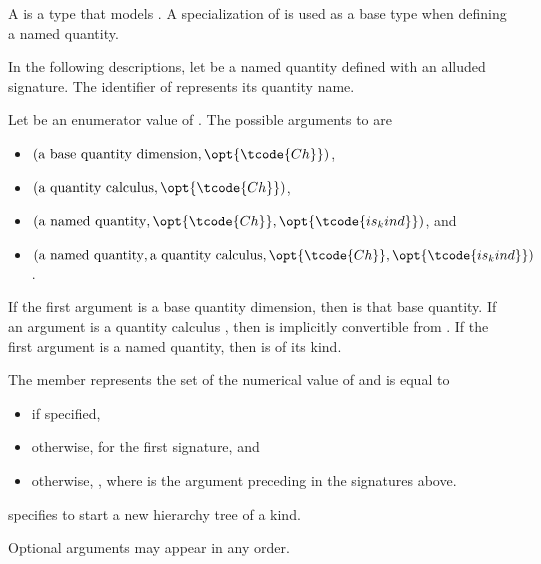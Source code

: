 \pnum
A  is a type that models .
A specialization of  is used as a base type when defining a named quantity.

\pnum
In the following descriptions, let  be a named quantity defined with an alluded signature.
The identifier of  represents its quantity name.

\pnum
Let  be an enumerator value of .
The possible arguments to  are
\begin{itemize}
\item
$(\text{a base quantity dimension}, \opt{\tcode{Ch}})$,
\item
$(\text{a quantity calculus}, \opt{\tcode{Ch}})$,
\item
$(\text{a named quantity}, \opt{\tcode{Ch}}, \opt{\tcode{is_kind}})$, and
\item
$(\text{a named quantity}, \text{a quantity calculus}, \opt{\tcode{Ch}}, \opt{\tcode{is_kind}})$.
\end{itemize}

\pnum
If the first argument is a base quantity dimension,
then  is that base quantity.
If an argument is a quantity calculus ,
then  is implicitly convertible from .
If the first argument is a named quantity,
then  is of its kind.

\pnum
The member  represents
the set of the numerical value of 
and is equal to
\begin{itemize}
\item
{} if specified,
\item
otherwise,  for the first signature, and
\item
otherwise, ,
where  is the argument preceding  in the signatures above.
\end{itemize}

\pnum
{} specifies  to start a new hierarchy tree of a kind.

\pnum
Optional arguments may appear in any order.

